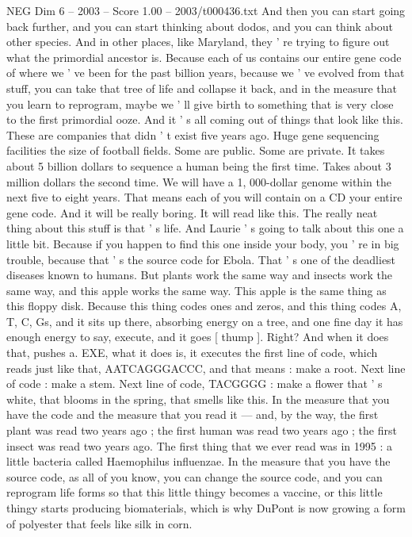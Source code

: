 \begin{textsample}{NEG Dim 6 – 2003 – Score 1.00 – 2003/t000436.txt}
And then you can start going back further, and you can start thinking about dodos, and you can think about other species.
And in other places, like Maryland, they ' re trying to figure out what the primordial ancestor is.
Because each of us contains our entire gene code of where we ' ve been for the past billion years, because we ' ve evolved from that stuff, you can take that tree of life and collapse it back, and in the measure that you learn to reprogram, maybe we ' ll give birth to something that is very close to the first primordial ooze.
And it ' s all coming out of things that look like this.
These are companies that didn ' t exist five years ago.
Huge gene sequencing facilities the size of football fields.
Some are public.
Some are private.
It takes about 5 billion dollars to sequence a human being the first time.
Takes about 3 million dollars the second time.
We will have a 1, 000-dollar genome within the next five to eight years.
That means each of you will contain on a CD your entire gene code.
And it will be really boring.
It will read like this.
The really neat thing about this stuff is that ' s life.
And Laurie ' s going to talk about this one a little bit.
Because if you happen to find this one inside your body, you ' re in big trouble, because that ' s the source code for Ebola.
That ' s one of the deadliest diseases known to humans.
But plants work the same way and insects work the same way, and this apple works the same way.
This apple is the same thing as this floppy disk.
Because this thing codes ones and zeros, and this thing codes A, T, C, Gs, and it sits up there, absorbing energy on a tree, and one fine day it has enough energy to say, execute, and it goes [ thump ].
Right?
And when it does that, pushes a.
EXE, what it does is, it executes the first line of code, which reads just like that, AATCAGGGACCC, and that means : make a root.
Next line of code : make a stem.
Next line of code, TACGGGG : make a flower that ' s white, that blooms in the spring, that smells like this.
In the measure that you have the code and the measure that you read it — and, by the way, the first plant was read two years ago ; the first human was read two years ago ; the first insect was read two years ago.
The first thing that we ever read was in 1995 : a little bacteria called Haemophilus influenzae.
In the measure that you have the source code, as all of you know, you can change the source code, and you can reprogram life forms so that this little thingy becomes a vaccine, or this little thingy starts producing biomaterials, which is why DuPont is now growing a form of polyester that feels like silk in corn.

\end{textsample}
